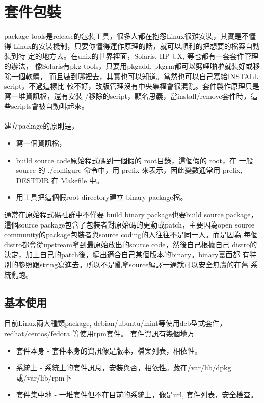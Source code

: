 \chapter{套件包裝}
package tools是release的包裝工具，很多人都在抱怨Linux很難安裝，其實是不懂得
Linux的安裝機制，只要你懂得運作原理的話，就可以順利的把想要的檔案自動裝到特
定的地方去。在unix的世界裡面，Solaris, HP-UX, 等也都有一套套件管理的辦法，
像Solaris有pkg tools，只要用pkgadd, pkgrm都可以劈哩啪啦就裝好或移除一個軟體，
而且裝到哪裡去，其實也可以知道。當然也可以自己寫給INSTALL script，不過這樣比
較不好，改版管理沒有中央集權會很混亂。套件製作原理只是寫一堆資訊檔，還有安裝
/移除的script，顧名思義，當install/remove套件時，這些scripts會被自動叫起來。
\\\\
建立package的原則是， 
\begin{itemize}
  \item 寫一個資訊檔，
  \item build source code原始程式碼到一個假的 root目錄，這個假的 root，在
    一般 source 的 ./configure 命令中，用 prefix 來表示，因此變數通常用
    prefix, DESTDIR 在 Makefile 中。
  \item 用工具把這個假root directory建立 binary package檔。
\end{itemize}
通常在原始程式碼社群中不僅要 build binary package也要build source package，
這個source package包含了包裝者對原始碼的更動或patch，主要因為open source 
community的package包裝者與source coding的人往往不是同一人。而是因為
每個distro都會從upstream拿到最原始放出的source code，然後自己根據自己
distro的決定，加上自己的patch後，編出適合自己某個版本的binary。binary裏面都
有特別的參照跟string寫進去。所以不是亂拿source編譯一通就可以安全無虞的在舊
系統亂跑。
\section{基本使用}
目前Linux兩大種類package, debian/ubuntu/mint等使用deb型式套件，
redhat/centos/fedora 等使用rpm套件。 套件資訊有幾個地方
\begin{itemize}
  \item 套件本身 - 套件本身的資訊像是版本，檔案列表，相依性。
  \item 系統上 - 系統上的套件訊息，安裝與否，相依性。藏在/var/lib/dpkg
    或/var/lib/rpm下
  \item 套件集中地 - 一堆套件但不在目前的系統上，像是url, 套件列表，安全檢查。
\end{itemize}

